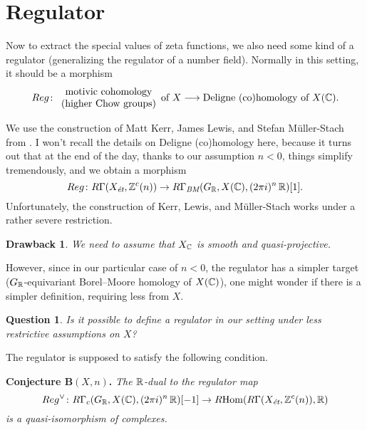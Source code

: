 \documentclass{article}
\theoremstyle{plain}
\newtheorem*{drawback*}{Drawback}
\newtheorem*{question*}{Question}
\begin{document}

\section{Regulator}

Now to extract the special values of zeta functions, we also need some kind of a
regulator (generalizing the regulator of a number field). Normally in this
setting, it should be a morphism
\[ Reg\colon
  \begin{array}{c}
    \text{motivic cohomology} \\
    \text{(higher Chow groups)}
  \end{array}\text{of }X
  \longrightarrow
  \text{Deligne (co)homology of }X(\mathbb{C}). \]

We use the construction of Matt Kerr, James Lewis, and Stefan Müller-Stach from
\cite{Kerr-Lewis-Muller-Stach-2006}. I won't recall the details on Deligne
(co)homology here, because it turns out that at the end of the day, thanks to
our assumption $n < 0$, things simplify tremendously, and we obtain a morphism
\[ Reg\colon R\Gamma(X_\text{\it ét},\mathbb{Z}^c (n)) \to
  R\Gamma_\text{\it BM} (G_{\mathbb{R}},X(\mathbb{C}),(2\pi i)^n\,\mathbb{R})[1]. \]
Unfortunately, the construction of Kerr, Lewis, and Müller-Stach works under
a rather severe restriction.

\begin{drawback*}
  We need to assume that $X_{\mathbb{C}}$ is smooth and quasi-projective.
\end{drawback*}

However, since in our particular case of $n < 0$, the regulator has a simpler
target ($G_{\mathbb{R}}$-equivariant Borel–Moore homology of $X(\mathbb{C})$), one might wonder
if there is a simpler definition, requiring less from $X$.

\begin{question*}
  Is it possible to define a regulator in our setting under less restrictive
  assumptions on $X$?
\end{question*}

The regulator is supposed to satisfy the following condition.

\vspace{1em}

\noindent\textbf{Conjecture $\mathbf{B}(X, n)$.}
\emph{The $\mathbb{R}$-dual to the regulator map
  $$Reg^\vee\colon R\Gamma_c (G_{\mathbb{R}}, X(\mathbb{C}), (2\pi i)^n\,\mathbb{R})[-1] \to
  R\!\operatorname{Hom}(R\Gamma(X_\text{\it ét}, \mathbb{Z}^c (n)), \mathbb{R})$$
  is a quasi-isomorphism of complexes.}
\end{document}
